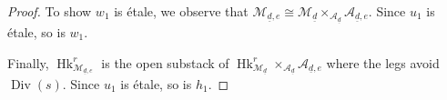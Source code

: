 \documentclass[reqno]{amsart}
\numberwithin{equation}{section}
\DeclareMathOperator{\Div}{Div}
\DeclareMathOperator{\pr}{pr}
\DeclareMathOperator{\Hk}{Hk}
\newcommand\un{\underline}
\newcommand\op{\oplus}
\renewcommand\c{\circ}
\renewcommand\d\delta
\newcommand\hs{\heartsuit}
\newcommand\cA{\mathcal{A}}
\newcommand\cE{\mathcal{E}}
\newcommand\cL{\mathcal{L}}
\newcommand\cM{\mathcal{M}}
\newcommand\cN{\mathcal{N}}
\theoremstyle{remark}
\numberwithin{equation}{section}
\begin{document}
\begin{proof}
To show $w_{1}$ is \'etale, we observe that $\cM_{\un d,e}\cong \cM_{\un d}\times_{\cA_{\un d}}\cA_{\un d,e}$. Since $u_{1}$ is \'etale, so is $w_{1}$. 



Finally,  $\Hk^{r}_{\cM_{\un d,e}}$ is the open substack of $\Hk^{r}_{\cM_{\un d}}\times_{\cA_{\un d}}\cA_{\un d,e}$  where the legs avoid $\Div(s)$. Since $u_{1}$ is \'etale,  so is $h_{1}$.
\end{proof}
\end{document}

